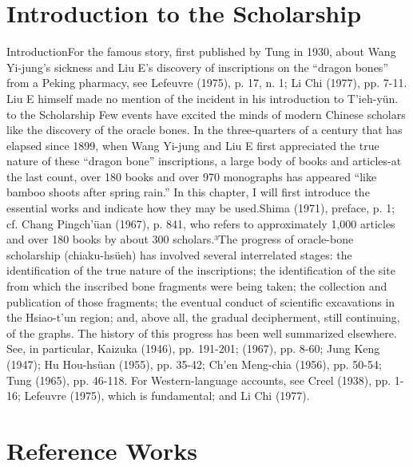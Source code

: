 
\section[Introduction to the Scholarship]{Introduction to the Scholarship}
\label{sec:chapters-ch03:3.1}

IntroductionFor the famous story, first published by Tung in 1930, about Wang Yi-jung's sickness and Liu E's discovery of inscriptions on the ``dragon bones'' from a Peking pharmacy, see Lefeuvre (1975), p. 17, n. 1; Li Chi (1977), pp. 7-11. Liu E himself made no mention of the incident in his introduction to T'ieh-yün. to the Scholarship
Few events have excited the minds of modern Chinese scholars like the discovery
of the oracle bones. In the three-quarters of a century that has elapsed since 1899, when
Wang Yi-jung and Liu E first appreciated the true nature of these ``dragon bone'' inscriptions, a large body of books and articles-at the last count, over 180 books and over 970
monographs has appeared “like bamboo shoots after spring rain.'' In this chapter, I
will first introduce the essential works and indicate how they may be used.Shima (1971), preface, p. 1; cf. Chang Pingch'üan (1967), p. 841, who refers to approximately 1,000 articles and over 180 books by about 300 scholars.³The progress of oracle-bone scholarship (chiaku-hsüeh) has involved several interrelated stages: the identification of the true nature of the inscriptions; the identification of the site from which the inscribed bone fragments were being taken; the collection and publication of those fragments; the eventual conduct of scientific excavations in the Hsiao-t'un region; and, above all, the gradual decipherment, still continuing, of the graphs. The history of this progress has been well summarized elsewhere. See, in particular, Kaizuka (1946), pp. 191-201; (1967), pp. 8-60; Jung Keng (1947); Hu Hou-hsüan (1955), pp. 35-42; Ch'en Meng-chia (1956), pp. 50-54; Tung (1965), pp. 46-118. For Western-language accounts, see Creel (1938), pp. 1-16; Lefeuvre (1975), which is fundamental; and Li Chi (1977).

\section[Reference Works]{Reference Works}
\label{sec:chapters-ch03:3.3}

